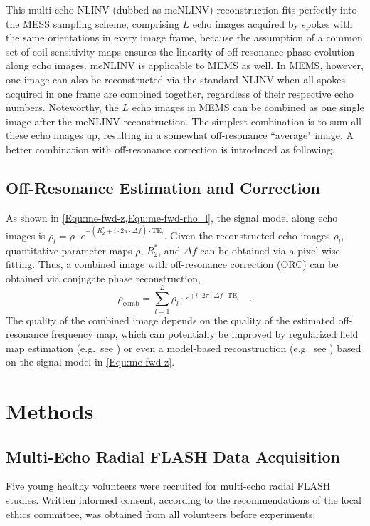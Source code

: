 This multi-echo NLINV (dubbed as meNLINV) reconstruction fits perfectly into the MESS sampling scheme, comprising $L$ echo images acquired by spokes with the same orientations in every image frame, because the assumption of a common set of coil sensitivity maps ensures the linearity of off-resonance phase evolution along echo images. meNLINV is applicable to MEMS as well. In MEMS, however, one image can also be reconstructed via the standard NLINV when all spokes acquired in one frame are combined together, regardless of their respective echo numbers. Noteworthy, the $L$ echo images in MEMS can be combined as one single image after the meNLINV reconstruction. The simplest combination is to sum all these echo images up, resulting in a somewhat off-resonance ``average" image. A better combination with off-resonance correction is introduced as following.

\subsection{Off-Resonance Estimation and Correction} \label{Sec:me-iORC}
As shown in \cref{Equ:me-fwd-z,Equ:me-fwd-rho_l}, the signal model along echo images is $\rho_l = \rho \cdot e^{- (R_2^* + i \cdot 2\pi \cdot \Delta f) \cdot \text{TE}_l}$. Given the reconstructed echo images $\rho_l$, quantitative parameter maps $\rho$, $R_2^*$, and $\Delta f$ can be obtained via a pixel-wise fitting. Thus, a combined image with off-resonance correction (\acs{ORC}) can be obtained via conjugate phase reconstruction,
\begin{equation} \label{Equ:me_cp}
  \rho_{\text{comb}} = \sum_{l=1}^{L} \rho_l \cdot e^{+ i \cdot 2\pi \cdot \Delta f \cdot \text{TE}_l} \quad .
\end{equation}
The quality of the combined image depends on the quality of the estimated off-resonance frequency map, which can potentially be improved by regularized field map estimation (e.g.~see \cite{2004_fim_est_spiral,2008_fim_est}) or even a model-based reconstruction (e.g.~see \cite{2008_r2s_fm_fMRI,2009_fim_t2s_me_TMI}) based on the signal model in \cref{Equ:me-fwd-z}. 


\section{Methods} \label{Sec:me-method}

\subsection{Multi-Echo Radial FLASH Data Acquisition}
Five young healthy volunteers were recruited for multi-echo radial FLASH studies. Written informed consent, according to the recommendations of the local ethics committee, was obtained from all volunteers before experiments.

